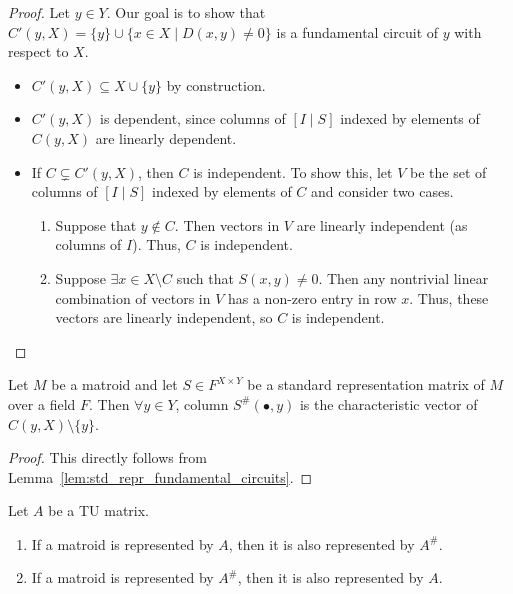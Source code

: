 \begin{proof}
    Let $y \in Y$. Our goal is to show that $C' (y, X) = \{y\} \cup \{x \in X \mid D (x, y) \neq 0\}$ is a fundamental circuit of $y$ with respect to $X$.
    \begin{itemize}
        \item $C' (y, X) \subseteq X \cup \{y\}$ by construction.
        \item $C' (y, X)$ is dependent, since columns of $[I \mid S]$ indexed by elements of $C (y, X)$ are linearly dependent.
        \item If $C \subsetneq C' (y, X)$, then $C$ is independent. To show this, let $V$ be the set of columns of $[I \mid S]$ indexed by elements of $C$ and consider two cases.
        \begin{enumerate}
            \item Suppose that $y \notin C$. Then vectors in $V$ are linearly independent (as columns of $I$). Thus, $C$ is independent.
            \item Suppose $\exists x \in X \setminus C$ such that $S (x, y) \neq 0$. Then any nontrivial linear combination of vectors in $V$ has a non-zero entry in row $x$. Thus, these vectors are linearly independent, so $C$ is independent.
        \end{enumerate}
    \end{itemize}
\end{proof}

\begin{lemma}\label{lem:std_repr_support_matrix_cols}
    Let $M$ be a matroid and let $S \in F^{X \times Y}$ be a standard representation matrix of $M$ over a field $F$. Then $\forall y \in Y$, column $S^{\#} (\bullet, y)$ is the characteristic vector of $C (y, X) \setminus \{y\}$.
\end{lemma}

\begin{proof}
    This directly follows from Lemma~\ref{lem:std_repr_fundamental_circuits}.
\end{proof}

\begin{lemma}\label{lem:repr_TU_iff_repr_TU_support}
    Let $A$ be a TU matrix.
    \begin{enumerate}
        \item If a matroid is represented by $A$, then it is also represented by $A^{\#}$.
        \item If a matroid is represented by $A^{\#}$, then it is also represented by $A$.
    \end{enumerate}
\end{lemma}

